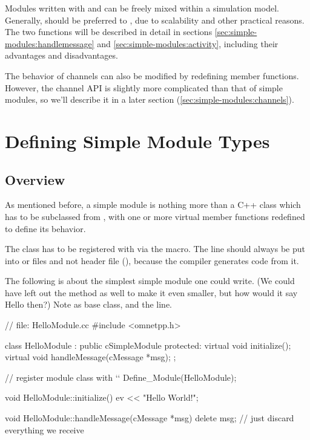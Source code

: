 Modules written with  and  can be
freely mixed within a simulation model. Generally, 
should be preferred to , due to scalability and other
practical reasons. The two functions will be described in detail in sections
\ref{sec:simple-modules:handlemessage} and \ref{sec:simple-modules:activity},
including their advantages and disadvantages.

The behavior of channels can also be modified by redefining member functions.
However, the channel API is slightly more complicated than that of simple
modules, so we'll describe it in a later section (\ref{sec:simple-modules:channels}).



\section{Defining Simple Module Types}
\label{sec:simple-modules:defining-simple-modules}

\subsection{Overview}

As mentioned before, a simple module is nothing more
than a C++ class which has to be subclassed from ,
with one or more virtual member functions redefined to define its behavior.

The class has to be registered with {\opp} via the  macro.
The  line should always be put into  or 
files and not header file (), because the compiler generates code from it.

The following  is about the simplest simple module one could write.
(We could have left out the  method as well to make it even smaller,
but how would it say Hello then?) Note  as base class,
and the  line.

\begin{cpp}
// file: HelloModule.cc
#include <omnetpp.h>

class HelloModule : public cSimpleModule
{
  protected:
    virtual void initialize();
    virtual void handleMessage(cMessage *msg);
};

// register module class with `\opp`
Define_Module(HelloModule);

void HelloModule::initialize()
{
    ev << "Hello World!\n";
}

void HelloModule::handleMessage(cMessage *msg)
{
    delete msg; // just discard everything we receive
}
\end{cpp}

